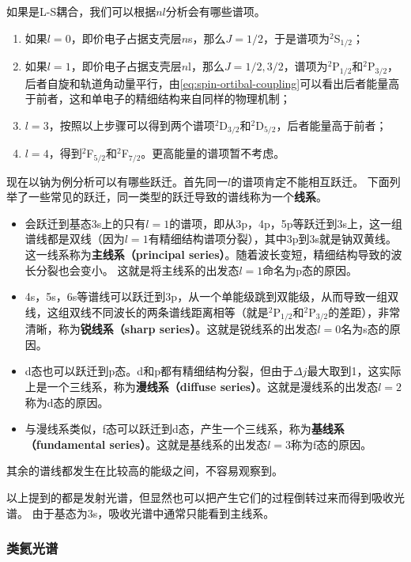 \documentclass[UTF8, a4paper]{ctexart}
\newcommand*{\lsterm}[3]{$^{#1}${#2}$_{#3}$}
\begin{document}
如果是L-S耦合，我们可以根据$nl$分析会有哪些谱项。
\begin{enumerate}
    \item 如果$l=0$，即价电子占据支壳层$n$s，那么$J=1/2$，于是谱项为\lsterm{2}{S}{1/2}；
    \item 如果$l=1$，即价电子占据支壳层$n$l，那么$J=1/2, 3/2$，谱项为\lsterm{2}{P}{1/2}和\lsterm{2}{P}{3/2}，后者自旋和轨道角动量平行，由\eqref{eq:spin-ortibal-coupling}可以看出后者能量高于前者，这和单电子的精细结构来自同样的物理机制；
    \item $l=3$，按照以上步骤可以得到两个谱项\lsterm{2}{D}{3/2}和\lsterm{2}{D}{5/2}，后者能量高于前者；
    \item $l=4$，得到\lsterm{2}{F}{5/2}和\lsterm{2}{F}{7/2}。更高能量的谱项暂不考虑。
\end{enumerate}

现在以钠为例分析可以有哪些跃迁。首先同一$l$的谱项肯定不能相互跃迁。
下面列举了一些常见的跃迁，同一类型的跃迁导致的谱线称为一个\textbf{线系}。

\begin{itemize}
    \item 会跃迁到基态3s上的只有$l=1$的谱项，即从3p，4p，5p等跃迁到3s上，这一组谱线都是双线（因为$l=1$有精细结构谱项分裂），其中3p到3s就是钠双黄线。
    这一线系称为\textbf{主线系（principal series）}。随着波长变短，精细结构导致的波长分裂也会变小。
    这就是将主线系的出发态$l=1$命名为p态的原因。
    \item 4s，5s，6s等谱线可以跃迁到3p，从一个单能级跳到双能级，从而导致一组双线，这组双线不同波长的两条谱线距离相等（就是\lsterm{2}{P}{1/2}和\lsterm{2}{P}{3/2}的差距），非常清晰，称为\textbf{锐线系（sharp series）}。这就是锐线系的出发态$l=0$名为s态的原因。
    \item d态也可以跃迁到p态。d和p都有精细结构分裂，但由于$\Delta j$最大取到1，这实际上是一个三线系，称为\textbf{漫线系（diffuse series）}。这就是漫线系的出发态$l=2$称为d态的原因。
    \item 与漫线系类似，f态可以跃迁到d态，产生一个三线系，称为\textbf{基线系（fundamental series）}。这就是基线系的出发态$l=3$称为f态的原因。
\end{itemize}

其余的谱线都发生在比较高的能级之间，不容易观察到。

以上提到的都是发射光谱，但显然也可以把产生它们的过程倒转过来而得到吸收光谱。
由于基态为3s，吸收光谱中通常只能看到主线系。

\subsubsection{类氦光谱}
\end{document}
